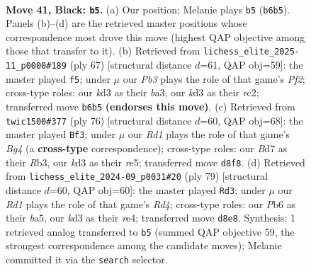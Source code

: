 \documentclass[11pt]{article}
\begin{document}
\clearpage

\begin{figure}[p]\centering
\begin{subfigure}{0.46\textwidth}\centering
\resizebox{\linewidth}{!}{%
\newchessgame
\chessboard[
  setfen={3r2k1/3b1p1p/1p4r1/p7/P2p2P1/1P1K1B1N/6RP/2R5 b - - 3 41},
  showmover=false,
  pgfstyle=straightmove, color=movearrow, markmove={b6-b5}
]}
\caption{}
\end{subfigure}\hfill
\begin{subfigure}{0.46\textwidth}\centering
\resizebox{\linewidth}{!}{%
\newchessgame
\chessboard[
  setfen={1r4k1/3r1pp1/4b3/7p/p2PB3/B5PP/1pR4K/3R4 b - - 1 34},
  showmover=false,
  pgfstyle=straightmove, color=movearrow, markmove={f7-f5}
]}
\caption{}
\end{subfigure}
\\[4pt]
\begin{subfigure}{0.46\textwidth}\centering
\resizebox{\linewidth}{!}{%
\newchessgame
\chessboard[
  setfen={8/ppr5/3b1k2/3Pr1p1/4PpB1/1R5P/P4RK1/8 w - - 0 39},
  showmover=false,
  pgfstyle=straightmove, color=movearrow, markmove={g4-f3}
]}
\caption{}
\end{subfigure}\hfill
\begin{subfigure}{0.46\textwidth}\centering
\resizebox{\linewidth}{!}{%
\newchessgame
\chessboard[
  setfen={6k1/3b3p/6r1/B1pr4/P1p1R1P1/2P4P/1P6/4R1K1 b - - 0 40},
  showmover=false,
  pgfstyle=straightmove, color=movearrow, markmove={d5-d3}
]}
\caption{}
\end{subfigure}
\caption{\textbf{Move 41, Black: \texttt{b5}.} (a) Our position; Melanie plays \texttt{b5} (\texttt{b6b5}). Panels (b)--(d) are the retrieved master positions whose correspondence most drove this move (highest QAP objective among those that transfer to it). (b) Retrieved from \texttt{lichess\_elite\_2025-11\_p0000\#189} (ply 67) [structural distance $d$=61, QAP obj=59]: the master played \texttt{f5}; under $\mu$ our \emph{Pb3} plays the role of that game's \emph{Pf2}; cross-type roles: our \emph{k}d3 as their \emph{b}a3, our \emph{k}d3 as their \emph{r}c2; transferred move \texttt{b6b5} \textbf{(endorses this move)}. (c) Retrieved from \texttt{twic1500\#377} (ply 76) [structural distance $d$=60, QAP obj=68]: the master played \texttt{Bf3}; under $\mu$ our \emph{Rd1} plays the role of that game's \emph{Bg4} (a \textbf{cross-type} correspondence); cross-type roles: our \emph{B}d7 as their \emph{R}b3, our \emph{k}d3 as their \emph{r}e5; transferred move \texttt{d8f8}. (d) Retrieved from \texttt{lichess\_elite\_2024-09\_p0031\#20} (ply 79) [structural distance $d$=60, QAP obj=60]: the master played \texttt{Rd3}; under $\mu$ our \emph{Rd1} plays the role of that game's \emph{Rd4}; cross-type roles: our \emph{P}b6 as their \emph{b}a5, our \emph{k}d3 as their \emph{r}e4; transferred move \texttt{d8e8}. Synthesis: 1 retrieved analog transferred to \texttt{b5} (summed QAP objective 59, the strongest correspondence among the candidate moves); Melanie committed it via the \texttt{search} selector.}
\label{fig:thought-m81}
\end{figure}
\end{document}

